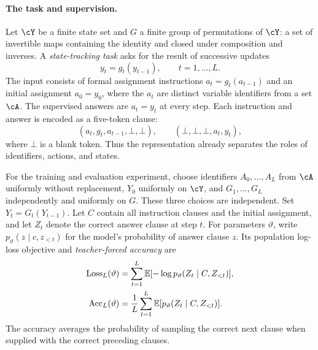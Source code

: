 \documentclass[11pt,twoside]{article}
\newcommand{\E}{\mathbb E}
\theoremstyle{definition}
\theoremstyle{remark}
\begin{document}
\paragraph{The task and supervision.}
Let $\cY$ be a finite state set and $G$ a finite group of permutations of
$\cY$: a set of invertible maps containing the identity and closed under
composition and inverses. A \emph{state-tracking task} asks for the result
of successive updates
\begin{equation}
y_t=g_t(y_{t-1}),\qquad t=1,\ldots,L.
\label{eq:state-tracking-task}
\end{equation}
The input consists of formal assignment instructions $a_t=g_t(a_{t-1})$
and an initial assignment $a_0=y_0$, where the $a_t$ are distinct variable identifiers from
a set $\cA$. The supervised answers are $a_t=y_t$ at every step. Each
instruction and answer is encoded as a five-token clause:
\[
(a_t,g_t,a_{t-1},\bot,\bot),
\qquad
(\bot,\bot,\bot,a_t,y_t),
\]
where $\bot$ is a blank token. Thus the representation already separates
the roles of identifiers, actions, and states.

For the training and evaluation experiment, choose identifiers
$A_0,\ldots,A_L$ from $\cA$ uniformly without replacement, $Y_0$ uniformly
on $\cY$, and $G_1,\ldots,G_L$ independently and uniformly on $G$. These three choices
are independent. Set $Y_t=G_t(Y_{t-1})$. Let $C$ contain all instruction
clauses and the initial assignment, and let $Z_t$ denote the correct answer
clause at step $t$. For parameters $\vartheta$, write
$p_\vartheta(z\mid c,z_{<t})$ for the model's probability of answer clause
$z$. Its population log-loss objective and \emph{teacher-forced accuracy}
are
\begin{align}
\operatorname{Loss}_L(\vartheta)
&=\sum_{t=1}^L\E[-\log p_\vartheta(Z_t\mid C,Z_{<t})],\notag\\
\operatorname{Acc}_L(\vartheta)
&=\frac1L\sum_{t=1}^L\E[p_\vartheta(Z_t\mid C,Z_{<t})].
\label{eq:state-tracking-accuracy}
\end{align}
The accuracy averages the probability of sampling the correct next clause
when supplied with the correct preceding clauses.
\end{document}
